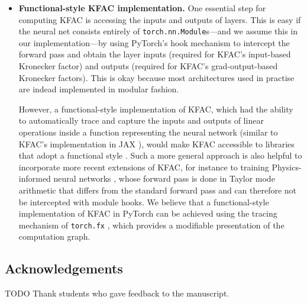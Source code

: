 \begin{itemize}
\item \textbf{Functional-style KFAC implementation.}
  One essential step for computing KFAC is accessing the inputs and outputs of layers.
  This is easy if the neural net consists entirely of \texttt{torch.nn.Module}s---and we assume this in our implementation---by using PyTorch's hook mechanism to intercept the forward pass and obtain the layer inputs (required for KFAC's input-based Kronecker factor) and outputs (required for KFAC's grad-output-based Kronecker factors).
  This is okay because most architectures used in practise are indead implemented in modular fashion.

  However, a functional-style implementation of KFAC, which had the ability to automatically trace and capture the inputs and outputs of linear operations inside a function representing the neural network (similar to KFAC's implementation in JAX \cite{botev2022kfac-jax}), would make KFAC accessible to libraries that adopt a functional style \citep[\eg][]{duffield2025scalable}.
  Such a more general approach is also helpful to incorporate more recent extensions of KFAC, for instance to training Physics-informed neural networks \cite{dangel2024kroneckerfactored}, whose forward pass is done in Taylor mode arithmetic that differs from the standard forward pass and can therefore not be intercepted with module hooks.
  We believe that a functional-style implementation of KFAC in PyTorch can be achieved using the tracing mechanism of \texttt{torch.fx} \cite{reed2022torch}, which provides a modifiable presentation of the computation graph.
\end{itemize}

\subsection*{Acknowledgements}
TODO Thank students who gave feedback to the manuscript.

